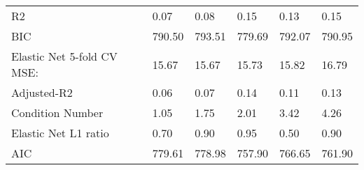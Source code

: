 \begin{table}
\begin{center}
\begin{tabular}{llllll}
R2                                             & 0.07    & 0.08    & 0.15    & 0.13    & 0.15      \\
BIC                                            & 790.50  & 793.51  & 779.69  & 792.07  & 790.95    \\
Elastic Net 5-fold CV MSE:                     & 15.67   & 15.67   & 15.73   & 15.82   & 16.79     \\
Adjusted-R2                                    & 0.06    & 0.07    & 0.14    & 0.11    & 0.13      \\
Condition Number                               & 1.05    & 1.75    & 2.01    & 3.42    & 4.26      \\
Elastic Net L1 ratio                           & 0.70    & 0.90    & 0.95    & 0.50    & 0.90      \\
AIC                                            & 779.61  & 778.98  & 757.90  & 766.65  & 761.90    \\
\hline
\end{tabular}
\end{center}
\end{table}